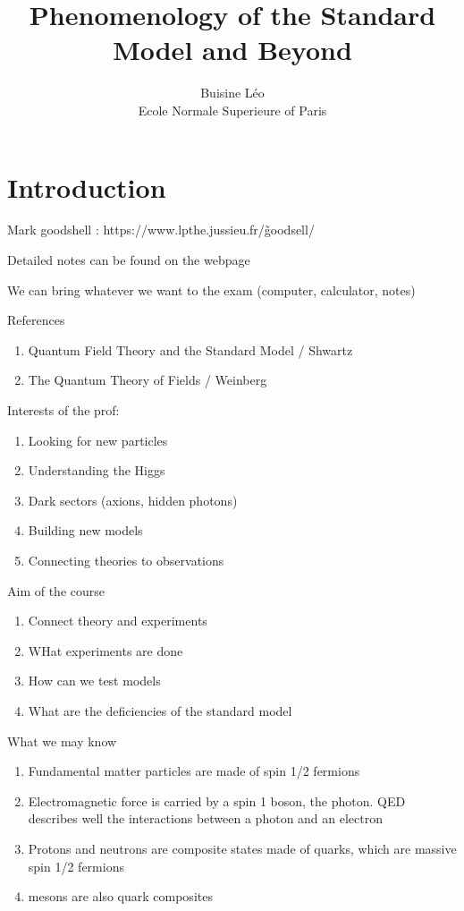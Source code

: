 \documentclass[a4paper]{book}
\theoremstyle{definition}
\theoremstyle{remark}
\begin{document}
\title{Phenomenology of the Standard Model and Beyond}
\author{Buisine Léo\\Ecole Normale Superieure of Paris}
\maketitle

\tableofcontents

\chapter{Introduction}
Mark goodshell : https://www.lpthe.jussieu.fr/\~goodsell/ \par 
Detailed notes can be found on the webpage 
\par \medskip 

We can bring whatever we want to the exam (computer, calculator, notes)\par \medskip 

References 
\begin{enumerate}
    \item Quantum Field Theory and the Standard Model / Shwartz 
    \item The Quantum Theory of Fields / Weinberg
\end{enumerate}

Interests of the prof: 
\begin{enumerate}
    \item Looking for new particles
    \item Understanding the Higgs
    \item Dark sectors (axions, hidden photons)
    \item Building new models
    \item Connecting theories to observations
\end{enumerate}

Aim of the course
\begin{enumerate}
    \item Connect theory and experiments
    \item WHat experiments are done 
    \item How can we test models 
    \item What are the deficiencies of the standard model 
\end{enumerate}

What we may know 
\begin{enumerate}
    \item Fundamental matter particles are made of spin 1/2 fermions 
    \item Electromagnetic force is carried by a spin 1 boson, the photon. QED describes well the interactions between a photon and an electron 
    \item Protons and neutrons are composite states made of quarks, which are massive spin 1/2 fermions 
    \item mesons are also quark composites
\end{enumerate}
\end{document}
